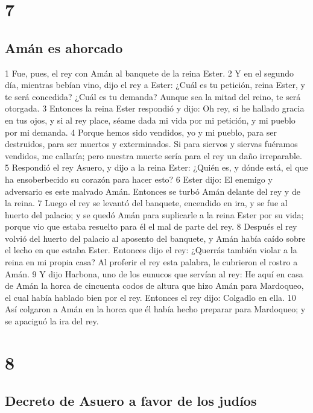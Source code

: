 \chapter{7}

\section*{Amán es ahorcado}

1 Fue, pues, el rey con Amán al banquete de la reina Ester.
2 Y en el segundo día, mientras bebían vino, dijo el rey a Ester: ¿Cuál es tu petición, reina Ester, y te será concedida? ¿Cuál es tu demanda? Aunque sea la mitad del reino, te será otorgada.
3 Entonces la reina Ester respondió y dijo: Oh rey, si he hallado gracia en tus ojos, y si al rey place, séame dada mi vida por mi petición, y mi pueblo por mi demanda.
4 Porque hemos sido vendidos, yo y mi pueblo, para ser destruidos, para ser muertos y exterminados. Si para siervos y siervas fuéramos vendidos, me callaría; pero nuestra muerte sería para el rey un daño irreparable.
5 Respondió el rey Asuero, y dijo a la reina Ester: ¿Quién es, y dónde está, el que ha ensoberbecido su corazón para hacer esto?
6 Ester dijo: El enemigo y adversario es este malvado Amán. Entonces se turbó Amán delante del rey y de la reina.
7 Luego el rey se levantó del banquete, encendido en ira, y se fue al huerto del palacio; y se quedó Amán para suplicarle a la reina Ester por su vida; porque vio que estaba resuelto para él el mal de parte del rey.
8 Después el rey volvió del huerto del palacio al aposento del banquete, y Amán había caído sobre el lecho en que estaba Ester. Entonces dijo el rey: ¿Querrás también violar a la reina en mi propia casa? Al proferir el rey esta palabra, le cubrieron el rostro a Amán.
9 Y dijo Harbona, uno de los eunucos que servían al rey: He aquí en casa de Amán la horca de cincuenta codos   de altura que hizo Amán para Mardoqueo, el cual había hablado bien por el rey. Entonces el rey dijo: Colgadlo en ella.
10 Así colgaron a Amán en la horca que él había hecho preparar para Mardoqueo; y se apaciguó la ira del rey.

\chapter{8}

\section*{Decreto de Asuero a favor de los judíos }

